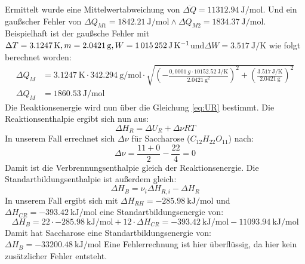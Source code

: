 Ermittelt wurde eine Mittelwertabweichung von $\overline{\Delta Q} = \qty{11312,94}{\joule\per\mole}$.
Und ein gaußscher Fehler von $\Delta Q_{M1} = \qty{1842,21}{\joule\per\mole} \wedge \Delta Q_{M2}=\qty{1834,37}{\joule\per\mole}$.
Beispielhaft ist der gaußsche Fehler mit  $\Delta T=\qty{3,1247}{\kelvin}, m=\qty{2,0421}{\gram}, W=\qty{10152
52}{\joule\per\kelvin}$und$ \Delta W=\qty{3,517}{\joule\per\kelvin}$ wie folgt berechnet worden:
\begin{align*}
\Delta Q_M &=\qty{3,1247}{\kelvin}\cdot \qty{342,294}{\gram\per\mole}\cdot \sqrt{\left( - \frac{0,0001\ g \cdot \qty{10152,52}{\joule\per\kelvin}}{\qty{2,0421}{\gram}^2}\right)^2 + \left( \frac{\qty{3,517}{\joule\per\kelvin}}{\qty{2,0421}{\gram}}\right)^2}\\
\Delta Q_M &= \qty{1860,53}{\joule\per\mole}
\end{align*}
Die Reaktionsenergie wird nun über die Gleichung \ref{eq:UR} bestimmt.
Die Reaktionsenthalpie ergibt sich nun aus:
$$ \Delta H_R = \Delta U_R + \Delta\nu RT$$
In unserem Fall errechnet sich $\Delta\nu$ für Saccharose ($C_{12}H_{22}O_{11}$) nach:
$$\Delta\nu = \frac{11+0}{2}-\frac{22}{4} = 0$$
Damit ist die Verbrennungsenthalpie gleich der Reaktionsenergie.
Die Standartbildungsenthalpie ist außerdem gleich:
$$\Delta H_B = \nu_i\Delta H_{R,i}-\Delta H_R$$
In unserem Fall ergibt sich mit $\Delta H_{RH} = \qty{-285,98}{\kilo\joule\per\mole}$ und  $\Delta H_{CR} = \qty{-393,42}{\kilo\joule\per\mole}$ eine Standartbildungsenergie von:
$$\Delta H_B=22\cdot\qty{-285,98}{\kilo\joule\per\mole} + 12\cdot \Delta H_{CR} = \qty{-393,42}{\kilo\joule\per\mole} - \qty{11093,94}{\kilo\joule\per\mole}$$
Damit hat Saccharose eine Standartbildungsenergie von: $\Delta H_B=\qty{-33200,48}{\kilo\joule\per\mole}$
Eine Fehlerrechnung ist hier überflüssig, da hier kein zusätzlicher Fehler entsteht.

